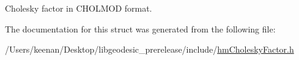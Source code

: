 Cholesky factor in C\-H\-O\-L\-M\-O\-D format. 



The documentation for this struct was generated from the following file\-:\begin{DoxyCompactItemize}
\item 
/\-Users/keenan/\-Desktop/libgeodesic\-\_\-prerelease/include/\hyperlink{hm_cholesky_factor_8h}{hm\-Cholesky\-Factor.\-h}\end{DoxyCompactItemize}
